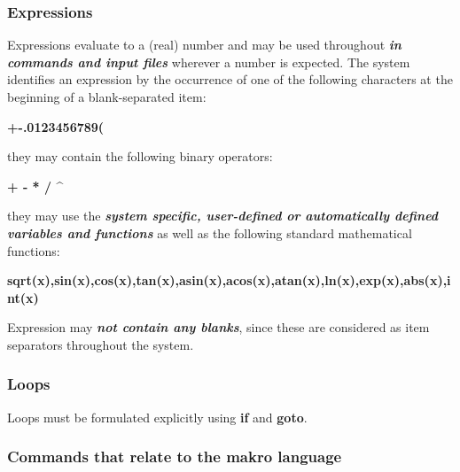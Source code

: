 \documentclass[]{article}
\begin{document}
\hypertarget{expressions}{%
\subsubsection{Expressions}\label{expressions}}

Expressions evaluate to a (real) number and may be used throughout
\emph{\textbf{in commands and input files}} wherever a number is
expected. The system identifies an expression by the occurrence of one
of the following characters at the beginning of a blank-separated item:

\textbf{+-.0123456789(}

they may contain the following binary operators:

\textbf{+ - * / \^{} }

they may use the \emph{\textbf{system specific, user-defined or
automatically defined variables and functions}} as well as the following
standard mathematical functions:

\textbf{sqrt(x),sin(x),cos(x),tan(x),asin(x),acos(x),atan(x),ln(x),exp(x),abs(x),int(x)}

Expression may \emph{\textbf{not contain any blanks}}, since these are
considered as item separators throughout the system.

\hypertarget{loops}{%
\subsubsection{Loops}\label{loops}}

Loops must be formulated explicitly using \textbf{if} and \textbf{goto}.

\hypertarget{commands-that-relate-to-the-makro-language}{%
\subsubsection{Commands that relate to the makro
language}\label{commands-that-relate-to-the-makro-language}}
\end{document}
